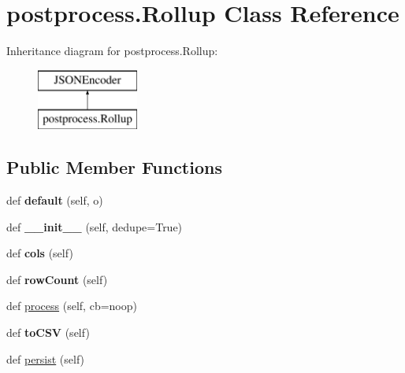 \hypertarget{classpostprocess_1_1_rollup}{}\section{postprocess.\+Rollup Class Reference}
\label{classpostprocess_1_1_rollup}
Inheritance diagram for postprocess.\+Rollup\+:\begin{figure}[H]
\begin{center}
\leavevmode
\includegraphics[height=2.000000cm]{d6/d68/classpostprocess_1_1_rollup}
\end{center}
\end{figure}
\subsection*{Public Member Functions}
\begin{DoxyCompactItemize}
\item 
\mbox{\label{classpostprocess_1_1_rollup_a250d32c70fbeb3797c138cfe4275bfc5}} 
def {\bfseries default} (self, o)
\item 
\mbox{\label{classpostprocess_1_1_rollup_aa43b4511241fdd5fc7e4351adfb872f5}} 
def {\bfseries \+\_\+\+\_\+init\+\_\+\+\_\+} (self, dedupe=True)
\item 
\mbox{\label{classpostprocess_1_1_rollup_ae53004dd09ba4e69ba49bc7e4d374fce}} 
def {\bfseries cols} (self)
\item 
\mbox{\label{classpostprocess_1_1_rollup_a221ea8953f9ba4a13110f484b466838f}} 
def {\bfseries row\+Count} (self)
\item 
def \mbox{\hyperlink{classpostprocess_1_1_rollup_a8145f33f9c53fcf556a8c525026461d4}{process}} (self, cb=noop)
\item 
\mbox{\label{classpostprocess_1_1_rollup_ae15f26467edb42439bb8eda2a7c81153}} 
def {\bfseries to\+C\+SV} (self)
\item 
def \mbox{\hyperlink{classpostprocess_1_1_rollup_a796206a71cbfbec7104b6da466aa18e5}{persist}} (self)
\end{DoxyCompactItemize}
